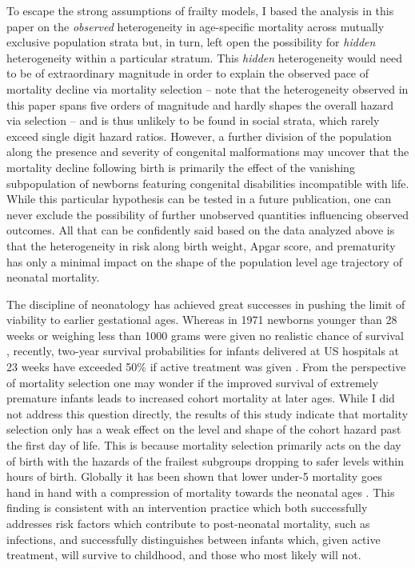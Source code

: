 \documentclass[10pt,twoside,reqno]{article}
\begin{document}
To escape the strong assumptions of frailty models, I based the analysis in this paper on the \emph{observed} heterogeneity in age-specific mortality across mutually exclusive population strata but, in turn, left open the possibility for \emph{hidden} heterogeneity within a particular stratum. This \emph{hidden} heterogeneity would need to be of extraordinary magnitude in order to explain the observed pace of mortality decline via mortality selection -- note that the heterogeneity observed in this paper spans five orders of magnitude and hardly shapes the overall hazard via selection -- and is thus unlikely to be found in social strata, which rarely exceed single digit hazard ratios. However, a further division of the population along the presence and severity of congenital malformations may uncover that the mortality decline following birth is primarily the effect of the vanishing subpopulation of newborns featuring congenital disabilities incompatible with life. While this particular hypothesis can be tested in a future publication, one can never exclude the possibility of further unobserved quantities influencing observed outcomes. All that can be confidently said based on the data analyzed above is that the heterogeneity in risk along birth weight, Apgar score, and prematurity has only a minimal impact on the shape of the population level age trajectory of neonatal mortality.

The discipline of neonatology has achieved great successes in pushing the limit of viability to earlier gestational ages. Whereas in 1971 newborns younger than 28 weeks or weighing less than 1000 grams were given no realistic chance of survival \citep{Malloy2022}, recently, two-year survival probabilities for infants delivered at US hospitals at 23 weeks have exceeded 50\% if active treatment was given \citep{Bell2022}. From the perspective of mortality selection one may wonder if the improved survival of extremely premature infants leads to increased cohort mortality at later ages. While I did not address this question directly, the results of this study indicate that mortality selection only has a weak effect on the level and shape of the cohort hazard past the first day of life. This is because mortality selection primarily acts on the day of birth with the hazards of the frailest subgroups dropping to safer levels within hours of birth. Globally it has been shown that lower under-5 mortality goes hand in hand with a compression of mortality towards the neonatal ages \citep{Hug2019}. This finding is consistent with an intervention practice which both successfully addresses risk factors which contribute to post-neonatal mortality, such as infections, and successfully distinguishes between infants which, given active treatment, will survive to childhood, and those who most likely will not.
\end{document}
